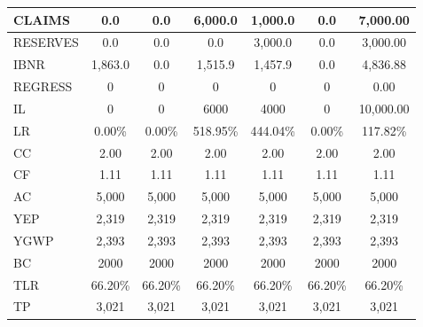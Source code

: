 \documentclass[11pt,a4paper,fleqn]{article}      %
\begin{document}
\begin{table}[H]
\begin{tabular}{|l|c|c|c|c|c|c|}
\rowcolor[HTML]{FFFE65} 
CLAIMS          & 0.0        & 0.0        & 6,000.0    & 1,000.0    & 0.0        & 7,000.00           \\ \hline
\rowcolor[HTML]{FFFE65} 
RESERVES        & 0.0        & 0.0        & 0.0        & 3,000.0    & 0.0        & 3,000.00           \\ \hline
\rowcolor[HTML]{3166FF} 
IBNR            & 1,863.0    & 0.0        & 1,515.9    & 1,457.9    & 0.0        & 4,836.88           \\ \hline
REGRESS         & 0          & 0          & 0          & 0          & 0          & 0.00               \\ \hline
IL              & 0          & 0          & 6000       & 4000       & 0          & 10,000.00          \\ \hline
LR              & 0.00\%     & 0.00\%     & 518.95\%   & 444.04\%   & 0.00\%     & 117.82\%           \\ \hline
CC              & 2.00       & 2.00       & 2.00       & 2.00       & 2.00       & 2.00               \\ \hline
CF              & 1.11       & 1.11       & 1.11       & 1.11       & 1.11       & 1.11               \\ \hline
AC              & 5,000      & 5,000      & 5,000      & 5,000      & 5,000      & 5,000              \\ \hline
YEP             & 2,319      & 2,319      & 2,319      & 2,319      & 2,319      & 2,319              \\ \hline
YGWP            & 2,393      & 2,393      & 2,393      & 2,393      & 2,393      & 2,393              \\ \hline
BC              & 2000       & 2000       & 2000       & 2000       & 2000       & 2000               \\ \hline
TLR             & 66.20\%    & 66.20\%    & 66.20\%    & 66.20\%    & 66.20\%    & 66.20\%            \\ \hline
TP              & 3,021      & 3,021      & 3,021      & 3,021      & 3,021      & 3,021              \\ \hline
\end{tabular}
\end{table}
\end{document}
